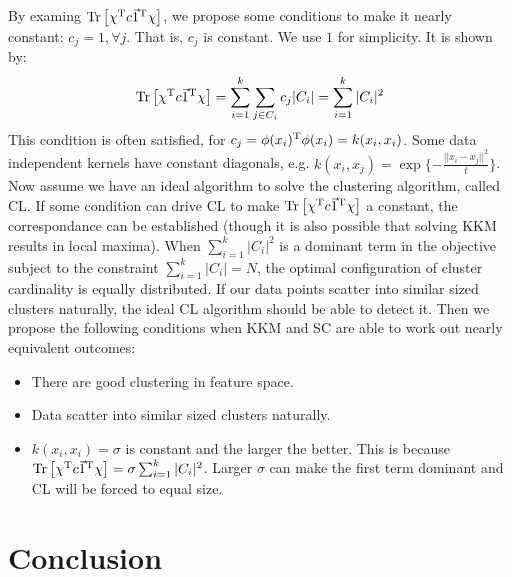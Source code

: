 By examing $ \mathrm{Tr}\left[ \chi^\mathrm{T}c\vec{1}^\mathrm{T}\chi \right] $, 
we propose some conditions to make it nearly constant:
$ c_j = 1, \forall j $. That is, $ c_j $ is constant. We 
use $ 1 $ for simplicity. It is shown by:
\begin{equation}
	\mathrm{Tr}\left[ \chi^\mathrm{T}c\vec{1}^\mathrm{T}\chi \right]
	= \sum_{i=1}^{k}\sum_{j \in C_i}c_j|C_i|
	=\sum_{i=1}^{k}|C_i|^2
\end{equation}
This condition is often satisfied, for 
$ c_j = \phi(x_i)^\mathrm{T}\phi(x_i) = k(x_i,x_i) $. Some 
data independent kernels have constant diagonals, 
e.g. $ k(x_i,x_j) = \exp\{-\frac{||x_i-x_j||^2}{t}\} $. 
Now assume we have an ideal algorithm to solve the clustering 
algorithm, called CL. If some condition can drive CL to 
make $ \mathrm{Tr}\left[ \chi^\mathrm{T}c\vec{1}^\mathrm{T}\chi \right] $ a constant, 
the correspondance can be established (though it is also possible 
that solving KKM results in local maxima). 
When $ \sum_{i=1}^{k}|C_i|^2 $ is a dominant term in the objective 
subject to the constraint $ \sum_{i=1}^{k}|C_i| = N $, the optimal 
configuration of cluster cardinality is equally distributed. 
If our data points scatter into similar sized clusters naturally, 
the ideal CL algorithm should be able to detect it. Then 
we propose the following conditions when KKM and SC are 
able to work out nearly equivalent outcomes:
\begin{itemize}
	\item There are good clustering in feature space. 
	\item Data scatter into similar sized clusters naturally. 
	\item $ k(x_i,x_i) = \sigma $ is constant and the larger the better. 
	This is because  $ \mathrm{Tr}\left[ \chi^\mathrm{T}c\vec{1}^\mathrm{T}\chi \right] =  \sigma \sum_{i=1}^{k}|C_i|^2$. 
	Larger $ \sigma $ can make the first term dominant and CL will 
	be forced to equal size. 
\end{itemize}

\section{Conclusion}
\label{sec:conclusion}

